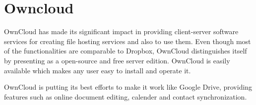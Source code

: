 \section{Owncloud}

OwnCloud has made its significant impact in providing client-server software
services for creating file hosting services and also to use them. Even though
most of the functionalities are comparable to Dropbox, OwnCloud distinguishes
itself by presenting as a open-source and free server edition. OwnCloud is
easily available which makes any user easy to install and operate it.

OwnCloud is putting its best efforts to make it work like Google Drive,
providing features such as online document editing, calender and contact
synchronization. \cite{Owncloud}
